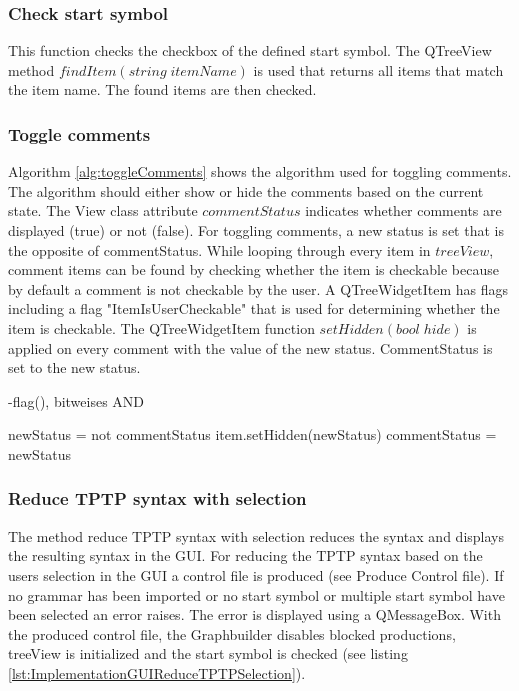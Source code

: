 \subsubsection{Check start symbol}\label{sec:ImplementationGUIStartsymbol}

This function checks the checkbox of the defined start symbol. The QTreeView method $findItem(string\; itemName)$ is used that returns all items that match the item name. 
The found items are then checked.

\subsubsection{Toggle comments}\label{sec:ImplementationGUIToggleComments}

Algorithm \ref{alg:toggleComments} shows the algorithm used for toggling comments. The algorithm should either show or hide the comments based on the current state. 
The View class attribute $commentStatus$ indicates whether comments are displayed (true) or not (false). For toggling comments, a new status is set that is the opposite of commentStatus. While looping through every item in $treeView$, comment items can be found by checking whether the item is checkable because by default a comment is not checkable by the user. A QTreeWidgetItem has flags including a flag "ItemIsUserCheckable" that is used for determining whether the item is checkable. The QTreeWidgetItem function $setHidden(bool\;hide)$ is applied on every comment with the value of the new status. CommentStatus is set to the new status. 

-flag(), bitweises AND 

\begin{algorithm}[H]
\caption{GUI Algorithm: toggle\textunderscore comments}
\label{alg:toggleComments}
\begin{algorithmic}[1] 
\State newStatus = not commentStatus
		\State item.setHidden(newStatus)
	\EndIf
\EndFor
\State commentStatus = newStatus
\end{algorithmic}
\end{algorithm}

\subsubsection{Reduce \ac{TPTP} syntax with selection}\label{sec:ImplementationGUIReduceWithSelection}

The method reduce \ac{TPTP} syntax with selection reduces the syntax and displays the resulting syntax in the GUI. 
For reducing the \ac{TPTP} syntax based on the users selection in the GUI a control file is produced (see Produce Control file). If no grammar has been imported or no start symbol or multiple start symbol have been selected an error raises. The error is displayed using a QMessageBox. With the produced control file, the Graphbuilder disables blocked productions, treeView is initialized  and the start symbol is checked (see listing \ref{lst:ImplementationGUIReduceTPTPSelection}). 

